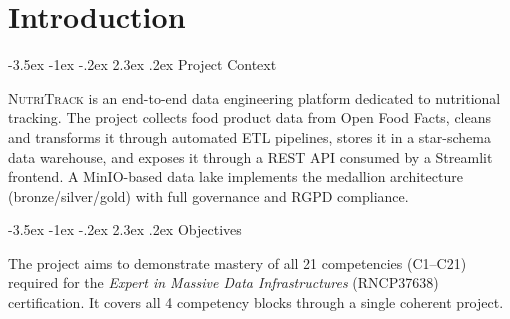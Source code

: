 \documentclass[a4paper,11pt,oneside,openany]{report}
\makeatletter
\renewcommand\section{\@startsection{section}{1}{\z@}%
  {-3.5ex \@plus -1ex \@minus -.2ex}%
  {2.3ex \@plus.2ex}%
  {\normalfont\Large\bfseries\color{ntgreen}}}
\newcommand{\nutritrack}{\textsc{NutriTrack}}
\newcommand{\off}{Open Food Facts}
\newcommand{\rgpd}{RGPD}
\makeatother
\begin{document}
\begin{titlepage}
\begin{center}
\vfill


\end{center}
\end{titlepage}

\tableofcontents

\clearpage

\chapter{Introduction}
\label{ch:intro}

\section{Project Context}

\nutritrack{} is an end-to-end data engineering platform dedicated to
nutritional tracking. The project collects food product data from \off{},
cleans and transforms it through automated ETL pipelines, stores it in a
star-schema data warehouse, and exposes it through a REST API consumed by
a Streamlit frontend. A MinIO-based data lake implements the medallion
architecture (bronze/silver/gold) with full governance and \rgpd{}
compliance.

\section{Objectives}

The project aims to demonstrate mastery of all 21 competencies (C1--C21)
required for the \textit{Expert in Massive Data Infrastructures}
(RNCP37638) certification. It covers all 4 competency blocks through a
single coherent project.
\end{document}
